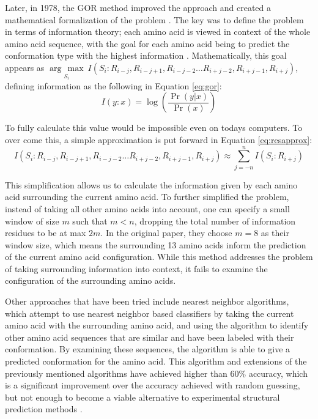 \documentclass[pageno]{jpaper}
\begin{document}
\par
Later, in 1978, the GOR method improved the approach and created a mathematical formalization of the problem \cite{singh:2005}.  The key was to define the problem in terms of information theory; each amino acid is viewed in context of the whole amino acid sequence, with the goal for each amino acid being to predict the conformation type with the highest information \cite{garnier:1978}.  Mathematically, this goal appears as $\underset{S_{i}}{\arg\,\max} \ I(S_{i}:R_{i - j}, R_{i - j + 1}, R_{i - j - 2} \ldots R_{i + j - 2}, R_{i + j - 1}, R_{i + j})$, defining information as the following in Equation \ref{eq:gor}:
\begin{equation}
	\label{eq:gor}
	I(y:x) = \log\left(\frac{\Pr\left(y \vert x\right)}{\Pr(x)}\right)
\end{equation}

To fully calculate this value would be impossible even on todays computers.  To over come this, a simple approximation is put forward in Equation \ref{eq:resapprox}:
\begin{equation}
	\label{eq:resapprox}
	I(S_{i}:R_{i - j}, R_{i - j + 1}, R_{i - j - 2} \ldots R_{i + j - 2}, R_{i + j - 1}, R_{i + j}) \approx \sum_{j = -n}^{n} I(S_{i} : R_{i + j})
\end{equation}

This simplification allows us to calculate the information given by each amino acid surrounding the current amino acid.  To further simplified the problem, instead of taking all other amino acids into account, one can specify a small window of size $m$ such that $m < n$, dropping the total number of information residues to be at max $2m$.  In the original paper, they choose $m = 8$ as their window size, which means the surrounding 13 amino acids inform the prediction of the current amino acid configuration.  While this method addresses the problem of taking surrounding information into context, it fails to examine the configuration of the surrounding amino acids.

\par
Other approaches that have been tried include nearest neighbor algorithms, which attempt to use nearest neighbor based classifiers by taking the current amino acid with the surrounding amino acid, and using the algorithm to identify other amino acid sequences that are similar and have been labeled with their conformation.  By examining these sequences, the algorithm is able to give a predicted conformation for the amino acid.  This algorithm and extensions of the previously mentioned algorithms have achieved higher than 60\% accuracy, which is a significant improvement over the accuracy achieved with random guessing, but not enough to become a viable alternative to experimental structural prediction methods \cite{singh:2005}.
\end{document}
